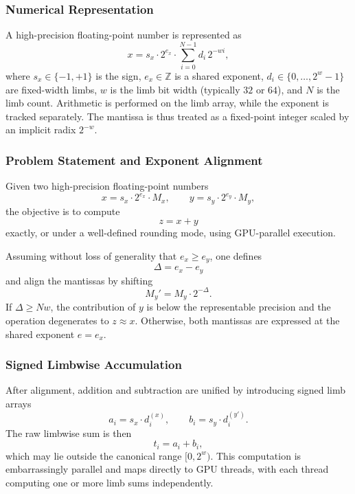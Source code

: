 \subsubsection{Numerical Representation}

A high-precision floating-point number is represented as
\begin{equation}
x = s_x \cdot 2^{e_x} \cdot \sum_{i=0}^{N-1} d_i \, 2^{-w i},
\end{equation}
where $s_x \in \{-1,+1\}$ is the sign, $e_x \in \mathbb{Z}$ is a shared exponent,
$d_i \in \{0,\dots,2^w-1\}$ are fixed-width limbs, $w$ is the limb bit width
(typically $32$ or $64$), and $N$ is the limb count. Arithmetic is performed on
the limb array, while the exponent is tracked separately. The mantissa is thus
treated as a fixed-point integer scaled by an implicit radix $2^{-w}$.

\subsubsection{Problem Statement and Exponent Alignment}

Given two high-precision floating-point numbers
\[
x = s_x \cdot 2^{e_x} \cdot M_x, \qquad
y = s_y \cdot 2^{e_y} \cdot M_y,
\]
the objective is to compute
\[
z = x + y
\]
exactly, or under a well-defined rounding mode, using GPU-parallel execution.

Assuming without loss of generality that $e_x \ge e_y$, one defines
\[
\Delta = e_x - e_y
\]
and align the mantissas by shifting
\begin{equation}
M_y' = M_y \cdot 2^{-\Delta}.
\end{equation}
If $\Delta \ge Nw$, the contribution of $y$ is below the representable precision
and the operation degenerates to $z \approx x$. Otherwise, both mantissas are
expressed at the shared exponent $e = e_x$.

\subsubsection{Signed Limbwise Accumulation}

After alignment, addition and subtraction are unified by introducing signed limb
arrays
\[
a_i = s_x \cdot d_i^{(x)}, \qquad
b_i = s_y \cdot d_i^{(y')}.
\]
The raw limbwise sum is then
\begin{equation}
t_i = a_i + b_i,
\end{equation}
which may lie outside the canonical range $[0,2^w)$. This computation is
embarrassingly parallel and maps directly to GPU threads, with each thread
computing one or more limb sums independently.

